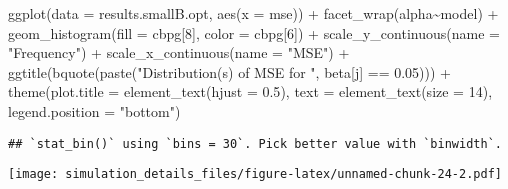 \documentclass[
]{article}
\newenvironment{Shaded}{\begin{snugshade}}{\end{snugshade}}
\newcommand{\AttributeTok}[1]{\textcolor[rgb]{0.77,0.63,0.00}{#1}}
\newcommand{\DecValTok}[1]{\textcolor[rgb]{0.00,0.00,0.81}{#1}}
\newcommand{\FloatTok}[1]{\textcolor[rgb]{0.00,0.00,0.81}{#1}}
\newcommand{\FunctionTok}[1]{\textcolor[rgb]{0.00,0.00,0.00}{#1}}
\newcommand{\NormalTok}[1]{#1}
\newcommand{\SpecialCharTok}[1]{\textcolor[rgb]{0.00,0.00,0.00}{#1}}
\newcommand{\StringTok}[1]{\textcolor[rgb]{0.31,0.60,0.02}{#1}}
\begin{document}
\begin{Shaded}
\begin{Highlighting}[]
\FunctionTok{ggplot}\NormalTok{(}\AttributeTok{data =}\NormalTok{ results.smallB.opt,}
       \FunctionTok{aes}\NormalTok{(}\AttributeTok{x =}\NormalTok{ mse)) }\SpecialCharTok{+}
  \FunctionTok{facet\_wrap}\NormalTok{(alpha}\SpecialCharTok{\textasciitilde{}}\NormalTok{model) }\SpecialCharTok{+}
  \FunctionTok{geom\_histogram}\NormalTok{(}\AttributeTok{fill =}\NormalTok{ cbpg[}\DecValTok{8}\NormalTok{], }\AttributeTok{color =}\NormalTok{ cbpg[}\DecValTok{6}\NormalTok{]) }\SpecialCharTok{+}
  \FunctionTok{scale\_y\_continuous}\NormalTok{(}\AttributeTok{name =} \StringTok{"Frequency"}\NormalTok{) }\SpecialCharTok{+}
  \FunctionTok{scale\_x\_continuous}\NormalTok{(}\AttributeTok{name =} \StringTok{"MSE"}\NormalTok{) }\SpecialCharTok{+}
  \FunctionTok{ggtitle}\NormalTok{(}\FunctionTok{bquote}\NormalTok{(}\FunctionTok{paste}\NormalTok{(}\StringTok{"Distribution(s) of MSE for "}\NormalTok{, beta[j] }\SpecialCharTok{==} \FloatTok{0.05}\NormalTok{))) }\SpecialCharTok{+}
  \FunctionTok{theme}\NormalTok{(}\AttributeTok{plot.title =} \FunctionTok{element\_text}\NormalTok{(}\AttributeTok{hjust =} \FloatTok{0.5}\NormalTok{), }
        \AttributeTok{text =} \FunctionTok{element\_text}\NormalTok{(}\AttributeTok{size =} \DecValTok{14}\NormalTok{),}
        \AttributeTok{legend.position =} \StringTok{"bottom"}\NormalTok{)}
\end{Highlighting}
\end{Shaded}

\begin{verbatim}
## `stat_bin()` using `bins = 30`. Pick better value with `binwidth`.
\end{verbatim}

\texttt{[image: simulation\_details\_files/figure-latex/unnamed-chunk-24-2.pdf]}
\end{document}

